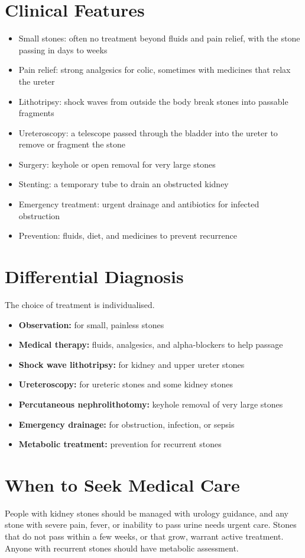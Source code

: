 \section*{Clinical Features}
\begin{itemize}
    \item Small stones: often no treatment beyond fluids and pain relief, with the stone passing in days to weeks
    \item Pain relief: strong analgesics for colic, sometimes with medicines that relax the ureter
    \item Lithotripsy: shock waves from outside the body break stones into passable fragments
    \item Ureteroscopy: a telescope passed through the bladder into the ureter to remove or fragment the stone
    \item Surgery: keyhole or open removal for very large stones
    \item Stenting: a temporary tube to drain an obstructed kidney
    \item Emergency treatment: urgent drainage and antibiotics for infected obstruction
    \item Prevention: fluids, diet, and medicines to prevent recurrence
\end{itemize}

\section*{Differential Diagnosis}
The choice of treatment is individualised.
\begin{itemize}
    \item \textbf{Observation:} for small, painless stones
    \item \textbf{Medical therapy:} fluids, analgesics, and alpha-blockers to help passage
    \item \textbf{Shock wave lithotripsy:} for kidney and upper ureter stones
    \item \textbf{Ureteroscopy:} for ureteric stones and some kidney stones
    \item \textbf{Percutaneous nephrolithotomy:} keyhole removal of very large stones
    \item \textbf{Emergency drainage:} for obstruction, infection, or sepsis
    \item \textbf{Metabolic treatment:} prevention for recurrent stones
\end{itemize}

\section*{When to Seek Medical Care}
People with kidney stones should be managed with urology guidance, and any stone with severe pain, fever, or inability to pass urine needs urgent care. Stones that do not pass within a few weeks, or that grow, warrant active treatment. Anyone with recurrent stones should have metabolic assessment.

